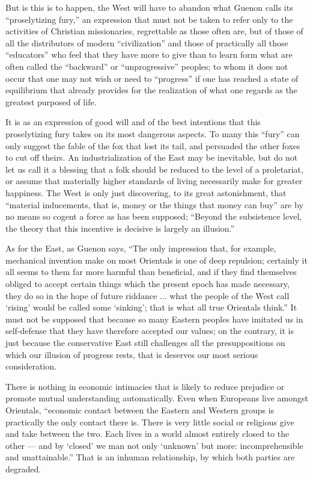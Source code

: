 But is this is to happen, the West will have to abandon what Guenon calls its ``proselytizing fury,'' an expression that must not be taken to refer only to the activities of Christian missionaries, regrettable as those often are, but of those of all the distributors of modern ``civilization'' and those of practically all those ``educators'' who feel that they have more to give than to learn form what are often called the ``backward'' or ``unprogressive'' peoples; to whom it does not occur that one may not wish or need to ``progress'' if one has reached a state of equilibrium that already provides for the realization of what one regards as the greatest purposed of life.

It is as an expression of good will and of the best intentions that this proselytizing fury takes on its most dangerous aspects. To many this ``fury'' can only suggest the fable of the fox that lost its tail, and persuaded the other foxes to cut off theirs. An industrialization of the East may be inevitable, but do not let us call it a blessing that a folk should be reduced to the level of a proletariat, or assume that materially higher standards of living necessarily make for greater happiness. The West is only just discovering, to its great astonishment, that ``material inducements, that is, money or the things that money can buy'' are by no means so cogent a force as has been supposed; ``Beyond the subsistence level, the theory that this incentive is decisive is largely an illusion.''

As for the East, as Guenon says, ``The only impression that, for example, mechanical invention make on most Orientals is one of deep repulsion; certainly it all seems to them far more harmful than beneficial, and if they find themselves obliged to accept certain things which the present epoch has made necessary, they do so in the hope of future riddance ... what the people of the West call `rising' would be called some `sinking'; that is what all true Orientals think.'' It must not be supposed that because so many Eastern peoples have imitated us in self-defense that they have therefore accepted our values; on the contrary, it is just because the conservative East still challenges all the presuppositions on which our illusion of progress rests, that is deserves our most serious consideration.

There is nothing in economic intimacies that is likely to reduce prejudice or promote mutual understanding automatically. Even when Europeans live amongst Orientals, ``economic contact between the Eastern and Western groups is practically the only contact there is. There is very little social or religious give and take between the two. Each lives in a world almost entirely closed to the other --- and by `closed' we man not only `unknown' but more: incomprehensible and unattainable.'' That is an inhuman relationship, by which both parties are degraded.

